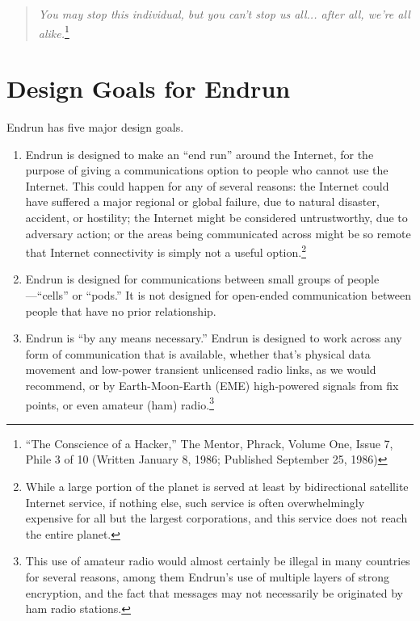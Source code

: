 \documentclass[12pt]{article}
\begin{document}
  \begin{quote}
    \emph{You may stop this individual, but you can't stop us all... after all, we're all alike.}\footnote{``The Conscience of a Hacker,'' The Mentor, Phrack, Volume One, Issue 7, Phile 3 of 10 (Written January 8, 1986; Published September 25, 1986)}
  \end{quote}
  
  \section{Design Goals for Endrun}
  
  Endrun has five major design goals.
  
  \begin{enumerate}
    \item Endrun is designed to make an ``end run'' around the Internet, for the purpose of giving a communications option to people who cannot use the Internet. This could happen for any of several reasons: the Internet could have suffered a major regional or global failure, due to natural disaster, accident, or hostility; the Internet might be considered untrustworthy, due to adversary action; or the areas being communicated across might be so remote that Internet connectivity is simply not a useful option.\footnote{While a large portion of the planet is served at least by bidirectional satellite Internet service, if nothing else, such service is often overwhelmingly expensive for all but the largest corporations, and this service does not reach the entire planet.}
    
    \item Endrun is designed for communications between small groups of people---``cells'' or ``pods.'' It is not designed for open-ended communication between people that have no prior relationship.
    
    \item Endrun is ``by any means necessary.'' Endrun is designed to work across any form of communication that is available, whether that's physical data movement and low-power transient unlicensed radio links, as we would recommend, or by Earth-Moon-Earth (EME) high-powered signals from fix points, or even amateur (ham) radio.\footnote{This use of amateur radio would almost certainly be illegal in many countries for several reasons, among them Endrun's use of multiple layers of strong encryption, and the fact that messages may not necessarily be originated by ham radio stations.}
    

\end{enumerate}
\end{document}
